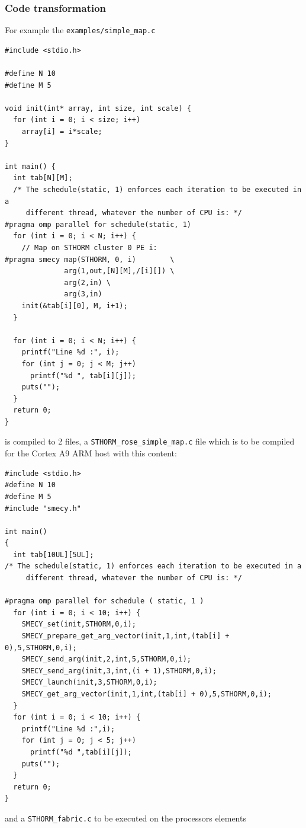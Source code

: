 \documentclass[a4paper]{article}
\begin{document}
\subsubsection{Code transformation}
\label{sec:code-transformation}

For example the \verb|examples/simple_map.c|
\begin{lstlisting}
#include <stdio.h>

#define N 10
#define M 5

void init(int* array, int size, int scale) {
  for (int i = 0; i < size; i++)
    array[i] = i*scale;
}

int main() {
  int tab[N][M];
  /* The schedule(static, 1) enforces each iteration to be executed in a
     different thread, whatever the number of CPU is: */
#pragma omp parallel for schedule(static, 1)
  for (int i = 0; i < N; i++) {
    // Map on STHORM cluster 0 PE i:
#pragma smecy map(STHORM, 0, i)        \
              arg(1,out,[N][M],/[i][]) \
              arg(2,in) \
              arg(3,in)
    init(&tab[i][0], M, i+1);
  }

  for (int i = 0; i < N; i++) {
    printf("Line %d :", i);
    for (int j = 0; j < M; j++)
      printf("%d ", tab[i][j]);
    puts("");
  }
  return 0;
}
\end{lstlisting}
is compiled to 2 files, a \texttt{STHORM_rose_simple_map.c} file which is
to be compiled for the Cortex A9 ARM host with this content:
\begin{lstlisting}
#include <stdio.h>
#define N 10
#define M 5
#include "smecy.h" 

int main()
{
  int tab[10UL][5UL];
/* The schedule(static, 1) enforces each iteration to be executed in a
     different thread, whatever the number of CPU is: */
  
#pragma omp parallel for schedule ( static, 1 )
  for (int i = 0; i < 10; i++) {
    SMECY_set(init,STHORM,0,i);
    SMECY_prepare_get_arg_vector(init,1,int,(tab[i] + 0),5,STHORM,0,i);
    SMECY_send_arg(init,2,int,5,STHORM,0,i);
    SMECY_send_arg(init,3,int,(i + 1),STHORM,0,i);
    SMECY_launch(init,3,STHORM,0,i);
    SMECY_get_arg_vector(init,1,int,(tab[i] + 0),5,STHORM,0,i);
  }
  for (int i = 0; i < 10; i++) {
    printf("Line %d :",i);
    for (int j = 0; j < 5; j++) 
      printf("%d ",tab[i][j]);
    puts("");
  }
  return 0;
}
\end{lstlisting}
and a \texttt{STHORM_fabric.c} to be executed on the processors elements
\end{document}
